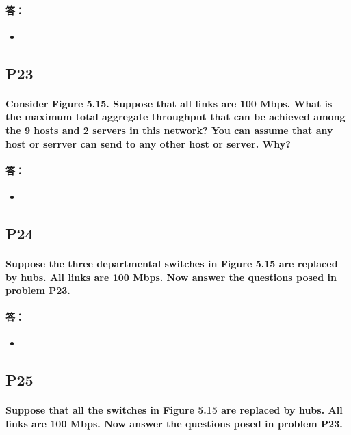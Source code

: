 \documentclass[a4paper]{ctexart}
\begin{document}
\paragraph*{答：} 
\begin{itemize}
    \item 
\end{itemize}

\subsection*{P23}
\paragraph*{Consider Figure 5.15. Suppose that all links are 100 Mbps. What is the maximum total aggregate throughput that can be achieved among the 9 hosts and 2 servers in this network? You can assume that any host or serrver can send to any other host or server. Why?\\}
\paragraph*{答：} 
\begin{itemize}
    \item 
\end{itemize}

\subsection*{P24}
\paragraph*{Suppose the three departmental switches in Figure 5.15 are replaced by hubs. All links are 100 Mbps. Now answer the questions posed in problem P23.\\}
\paragraph*{答：} 
\begin{itemize}
    \item 
\end{itemize}

\subsection*{P25}
\paragraph*{Suppose that all the switches in Figure 5.15 are replaced by hubs. All links are 100 Mbps. Now answer the questions posed in problem P23. \\}
\end{document}
